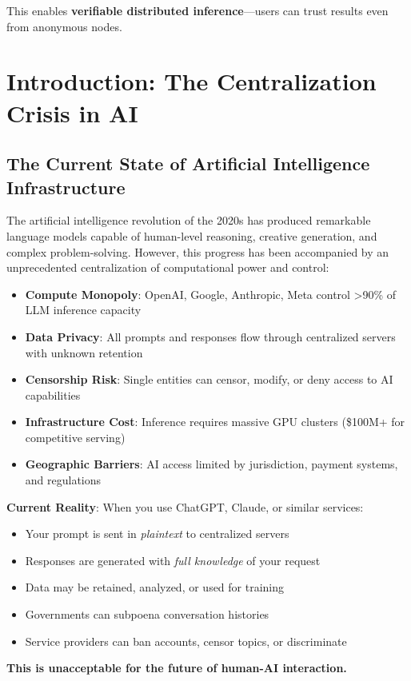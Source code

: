 \documentclass[11pt,a4paper]{article}
\begin{document}
This enables \textbf{verifiable distributed inference}---users can trust results even from anonymous nodes.

\newpage
\section{Introduction: The Centralization Crisis in AI}

\subsection{The Current State of Artificial Intelligence Infrastructure}

The artificial intelligence revolution of the 2020s has produced remarkable language models capable of human-level reasoning, creative generation, and complex problem-solving. However, this progress has been accompanied by an unprecedented centralization of computational power and control:

\begin{itemize}[leftmargin=*]
    \item \textbf{Compute Monopoly}: OpenAI, Google, Anthropic, Meta control >90\% of LLM inference capacity
    \item \textbf{Data Privacy}: All prompts and responses flow through centralized servers with unknown retention
    \item \textbf{Censorship Risk}: Single entities can censor, modify, or deny access to AI capabilities
    \item \textbf{Infrastructure Cost}: Inference requires massive GPU clusters (\$100M+ for competitive serving)
    \item \textbf{Geographic Barriers}: AI access limited by jurisdiction, payment systems, and regulations
\end{itemize}

\begin{tcolorbox}[colback=quantumgold!10,colframe=quantumgold,title=\textbf{The Privacy Catastrophe}]
\textbf{Current Reality}: When you use ChatGPT, Claude, or similar services:
\begin{itemize}
    \item Your prompt is sent in \textit{plaintext} to centralized servers
    \item Responses are generated with \textit{full knowledge} of your request
    \item Data may be retained, analyzed, or used for training
    \item Governments can subpoena conversation histories
    \item Service providers can ban accounts, censor topics, or discriminate
\end{itemize}
\textbf{This is unacceptable for the future of human-AI interaction.}
\end{tcolorbox}
\end{document}
